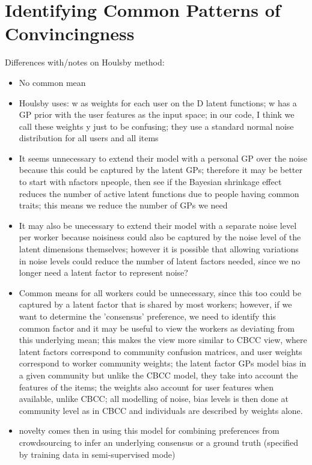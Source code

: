 \section{Identifying Common Patterns of Convincingness}\label{sec:model}

Differences with/notes on Houlsby method:
\begin{itemize}
  \item No common mean
  \item Houlsby uses: w as weights for each user on the D latent functions; w has a GP prior with the user features
  as the input space; 
  in our code, I think we call these weights y just to be confusing;  they use a standard normal noise distribution
  for all users and all items
  \item It seems unnecessary to extend their model with a personal GP over the noise because this could be captured 
  by the latent GPs; therefore it may be better to start with nfactors \leq npeople, then see if the Bayesian shrinkage
  effect reduces the number of active latent functions due to people having common traits; this means we reduce the 
  number of GPs we need
  \item It may also be unecessary to extend their model with a separate noise level per worker because noisiness could also be captured by the noise level of the latent dimensions themselves; however it is possible that allowing
  variations in noise levels could reduce the number of latent factors needed, since we no longer need a latent
  factor to represent noise?
  \item Common means for all workers could be unnecessary, since this too could be captured by a latent factor that
  is shared by most workers; however, if we want to determine the 'consensus' preference, we need to identify this 
  common factor and it may be useful to view the workers as deviating from this underlying mean; this makes the view 
  more similar to CBCC view, where latent factors correspond to community confusion matrices, and user weights 
  correspond to worker community weights; the latent factor GPs model bias in a given community but unlike the CBCC model, they take into account the features of the items; the weights also account for user features when available, unlike CBCC; all modelling of noise, bias levels is then done at community level as in CBCC and individuals are
  described by weights alone.
  \item novelty comes then in using this model for combining preferences from crowdsourcing to infer an underlying consensus or a ground truth (specified by training data in semi-supervised mode) 

\end{itemize}
